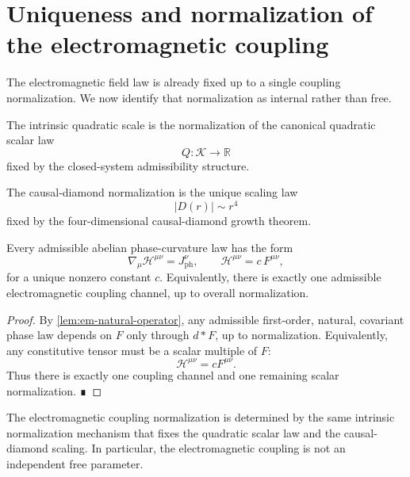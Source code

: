 \section{Uniqueness and normalization of the electromagnetic coupling}
\label{sec:em-normalization}
The electromagnetic field law is already fixed up to a single coupling
normalization.
We now identify that normalization as internal rather than free.
\begin{definition}
	The intrinsic quadratic scale is the normalization of the canonical
	quadratic scalar law
	\[
		Q:\mathcal K\to\mathbb R
	\]
	fixed by the closed-system admissibility structure.
\end{definition}
\begin{definition}
	The causal-diamond normalization is the unique scaling law
	\[
		|D(r)|\sim r^4
	\]
	fixed by the four-dimensional causal-diamond growth theorem.
\end{definition}
\begin{theorem}
	Every admissible abelian phase-curvature law has the form
	\[
		\nabla_\mu \mathcal H^{\mu\nu}=J_{\mathrm{ph}}^\nu,
		\qquad
		\mathcal H^{\mu\nu}=c\,F^{\mu\nu},
	\]
	for a unique nonzero constant \(c\).
	Equivalently, there is exactly one admissible electromagnetic coupling
	channel, up to overall normalization.
\end{theorem}
\begin{proof}
	By \cref{lem:em-natural-operator}, any admissible first-order, natural,
	covariant phase law depends on \(F\) only through \(d{*}F\), up to
	normalization.
	Equivalently, any constitutive tensor must be a scalar multiple of
	\(F\):
	\[
		\mathcal H^{\mu\nu}=cF^{\mu\nu}.
	\]
	Thus there is exactly one coupling channel and one remaining scalar
	normalization. ∎
\end{proof}
\begin{theorem}
	\label{thm:em-intrinsic-normalization}
	The electromagnetic coupling normalization is determined by the same
	intrinsic normalization mechanism that fixes the quadratic scalar law
	and the causal-diamond scaling.
	In particular, the electromagnetic coupling is not an independent free
	parameter.
\end{theorem}
